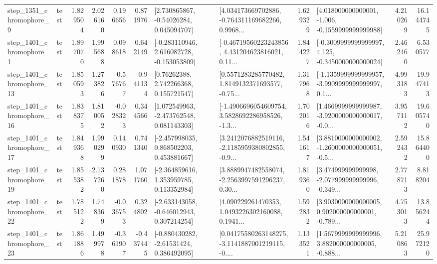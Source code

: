 \begin{tabular}{llrrrrllrlrr}
  step\_1351\_chromophore\_9 &      test &      1.829504 &    2.026160 &      0.196656 &  0.871976 &     [2.730865867, -0.54026284, 0.045094707] &  [4.034173669702886, -0.764311169682266, 0.9968... &       1.629329 &   [4.018000000000001, -1.006, -0.1559999999999988] &            4.210269 &         16.144745 \\
  step\_1401\_chromophore\_1 &      test &      1.897070 &    1.995688 &      0.098618 &  0.642149 &   [-0.283110946, 2.616082728, -0.153053809] &  [-0.46719560223243856, 4.431204623816021, 0.11... &       1.844227 &  [-0.3009999999999997, 4.125, -0.3450000000000024] &            2.462460 &          6.530577 \\
 step\_1401\_chromophore\_13 &      test &      1.850593 &    1.273826 &     -0.576767 & -0.941134 &      [0.76262388, 2.742266368, 0.155721547] &  [0.5571283285770482, 1.8149132371693577, -0.75... &       1.317968 &  [-1.1359999999999957, -3.9909999999999997, 0.1... &            4.993183 &         19.947413 \\
 step\_1401\_chromophore\_16 &      test &      1.838375 &    1.810052 &     -0.028323 &  0.344566 &    [1.072549963, -2.473762548, 0.081143303] &  [-1.4906696054609754, 3.5828692286958526, -1.3... &       1.702016 &  [1.4669999999999987, -3.9200000000000017, -0.0... &            3.957112 &         19.605740 \\
 step\_1401\_chromophore\_17 &      test &      1.849368 &    1.990299 &      0.140930 &  0.741340 &    [-2.457998035, 0.868502203, 0.453881667] &  [3.2412076882519116, -2.1185959380802855, -0.9... &       1.541617 &  [3.8810000000000002, -1.2600000000000051, -0.5... &            2.592432 &         15.864400 \\
 step\_1401\_chromophore\_19 &      test &      1.855382 &    2.137260 &      0.281878 &  1.071760 &    [-2.364859616, 1.353959785, 0.113352984] &  [3.8889947482558074, -2.2563997591296237, 0.30... &       1.819360 &  [3.474999999999998, -2.077999999999996, -0.349... &            2.778713 &          8.818204 \\
 step\_1401\_chromophore\_22 &      test &      1.785122 &    1.748369 &     -0.036753 &  0.324802 &   [-2.633143058, -0.646012943, 0.307214254] &  [4.090229261470353, 1.0493226302160088, 0.1941... &       1.592832 &  [3.9030000000000005, 0.902000000000001, -0.789... &            4.753013 &         13.856244 \\
 step\_1401\_chromophore\_23 &      test &      1.861886 &    1.499978 &     -0.361907 & -0.437445 &    [-0.880430282, -2.61531424, 0.386492095] &  [0.04175580263148275, -3.1141887001219115, -0.... &       1.133521 &  [1.5679999999999996, 3.882000000000005, -0.888... &            5.210863 &         25.972120 \\

\end{tabular}
